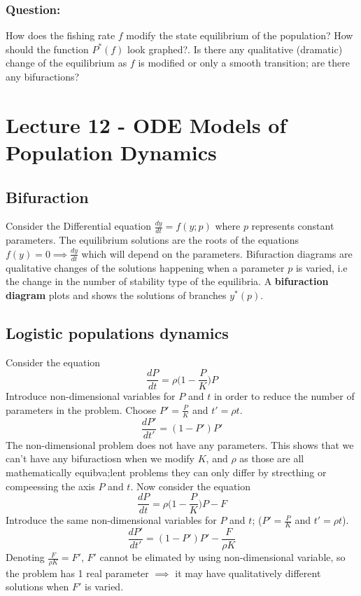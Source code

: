 \documentclass{report}
\theoremstyle{definition}
\theoremstyle{plain}
\theoremstyle{remark}
\begin{document}
\subsubsection*{Question:}
How does the fishing rate $ f $ modify the state equilibrium of the population?
How should the function $ P^* (f) $ look graphed?. Is there any qualitative
(dramatic) change of the equilibrium as $ f $ is modified or only a smooth
transition; are there any bifuractions?
\section{Lecture 12 - ODE Models of Population Dynamics}
\subsection{Bifuraction}
Consider the Differential equation $ \displaystyle \frac{dy}{dt} = f(y;p)
$ where $ p $ represents constant parameters. The equilibrium solutions are the
roots of the equations $ f(y) = 0 \implies \displaystyle \frac{dy}{dt} $ which
will depend on the parameters. Bifuraction diagrams are qualitative changes of
the solutions happening when a parameter $ p $ is varied, i.e the change in the
number of stability type of the equilibria. A \textbf{bifuraction diagram}
plots and shows the solutions of branches $ y^*(p) $. 
\subsection{Logistic populations dynamics}
Consider the equation 
$$ \frac{dP}{dt} = \rho \Big (1 - \frac{P}{K} \Big ) P $$
Introduce non-dimensional variables for $ P $ and $ t $ in order to reduce the
number of parameters in the problem. Choose $ P' = \frac{P}{K}  $ and $ t'
= \rho t $. 
$$ \frac{dP'}{dt'} = (1-P')P' $$
The non-dimensional problem does not have any parameters. This shows that we
can't have any bifuractiosn when we modify $ K $, and $ \rho $ as those are all
mathematically equibva;lent problems they can only differ by strecthing or
compeessing the axis $ P $ and $ t $. Now consider the equation 
$$ \frac{dP}{dt} = \rho \Big (1 - \frac{P}{K} \Big) P - F $$
Introduce the same non-dimensional variables for $ P $ and $ t $;
($ P' = \frac{P}{K} $ and $ t' = \rho t $).
$$ \frac{dP'}{dt'} = (1-P')P' - \frac{F}{\rho K} $$
Denoting $ \displaystyle \frac{F}{\rho K} = F' $, $ F' $ cannot be elimated by
using non-dimensional variable, so the problem has 1 real parameter $ \implies
$ it may have qualitatively different solutions when $ F' $ is varied.
\end{document}

